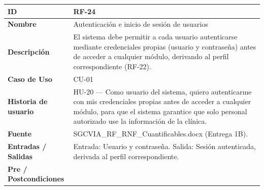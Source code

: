 \documentclass[
]{article}
\newcounter{none} %
\begin{document}
{\def\LTcaptype{none} %
\begin{longtable}[]{|
  >{\raggedright\arraybackslash}p{}|
  >{\raggedright\arraybackslash}p{}|}
\hline
\begin{minipage}[b]{\linewidth}\raggedright
\textbf{ID}
\end{minipage} & \begin{minipage}[b]{\linewidth}\raggedright
RF-24
\end{minipage} \\
\hline
\endhead
\hline
\endlastfoot
\textbf{Nombre} & \begin{minipage}[t]{\linewidth}\raggedright
Autenticación e inicio de sesión de usuarios
\end{minipage} \\
\hline
\textbf{Descripción} & \begin{minipage}[t]{\linewidth}\raggedright
El sistema debe permitir a cada usuario autenticarse mediante credenciales propias (usuario y contraseña) antes de acceder a cualquier módulo, derivando al perfil correspondiente (RF-22).
\end{minipage} \\
\hline
\textbf{Caso de Uso} & \begin{minipage}[t]{\linewidth}\raggedright
CU-01
\end{minipage} \\
\hline
\textbf{Historia de usuario} & \begin{minipage}[t]{\linewidth}\raggedright
HU-20 — Como usuario del sistema, quiero autenticarme con mis credenciales propias antes de acceder a cualquier módulo, para que el sistema garantice que solo personal autorizado use la información de la clínica.
\end{minipage} \\
\hline
\textbf{Fuente} & \begin{minipage}[t]{\linewidth}\raggedright
SGCVIA\_RF\_RNF\_Cuantificables.docx (Entrega 1B).
\end{minipage} \\
\hline
\textbf{Entradas / Salidas} & \begin{minipage}[t]{\linewidth}\raggedright
Entrada: Usuario y contraseña. Salida: Sesión autenticada, derivada al perfil correspondiente.
\end{minipage} \\
\hline
\textbf{Pre / Postcondiciones} & \begin{minipage}[t]{\linewidth}\raggedright

\end{minipage}
\end{longtable}}
\end{document}
